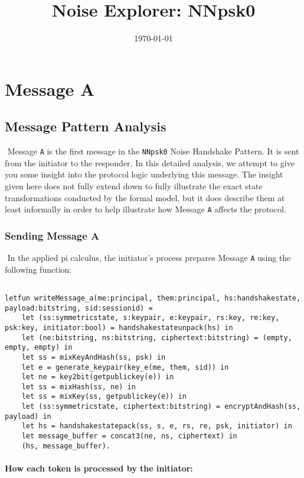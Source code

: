 \title{Noise Explorer: NNpsk0}\date{\today}\maketitle\section{ Message A}

\subsection{Message Pattern Analysis}$ $
Message \texttt{A} is the first message in the \texttt{NNpsk0} Noise Handshake Pattern. It is sent from the initiator to the responder. In this detailed analysis, we attempt to give you some insight into the protocol logic underlying this message. The insight given here does not fully extend down to fully illustrate the exact state transformations conducted by the formal model, but it does describe them at least informally in order to help illustrate how Message \texttt{A} affects the protocol.


\subsubsection{Sending Message A}$ $
In the applied pi calculus, the initiator's process prepares Message \texttt{A} using the following function:


\begin{lstlisting}

letfun writeMessage_a(me:principal, them:principal, hs:handshakestate, payload:bitstring, sid:sessionid) =
	let (ss:symmetricstate, s:keypair, e:keypair, rs:key, re:key, psk:key, initiator:bool) = handshakestateunpack(hs) in
	let (ne:bitstring, ns:bitstring, ciphertext:bitstring) = (empty, empty, empty) in
	let ss = mixKeyAndHash(ss, psk) in
	let e = generate_keypair(key_e(me, them, sid)) in
	let ne = key2bit(getpublickey(e)) in
	let ss = mixHash(ss, ne) in
	let ss = mixKey(ss, getpublickey(e)) in
	let (ss:symmetricstate, ciphertext:bitstring) = encryptAndHash(ss, payload) in
	let hs = handshakestatepack(ss, s, e, rs, re, psk, initiator) in
	let message_buffer = concat3(ne, ns, ciphertext) in
	(hs, message_buffer).

\end{lstlisting}

\paragraph{How each token is processed by the initiator:}$ $

